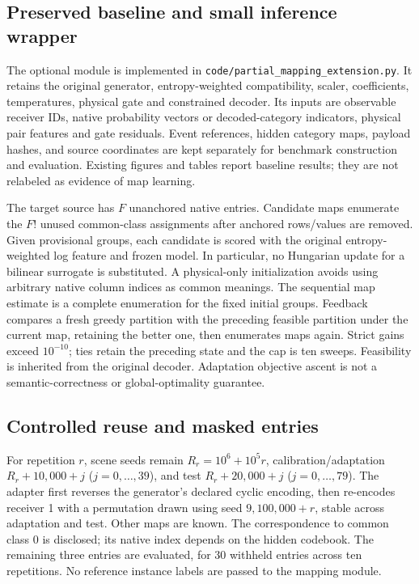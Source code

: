 \documentclass[10pt,a4paper]{article}
\begin{document}
\subsection{Preserved baseline and small inference wrapper}
The optional module is implemented in \texttt{code/partial\_mapping\_extension.py}. It retains the original generator, entropy-weighted compatibility, scaler, coefficients, temperatures, physical gate and constrained decoder. Its inputs are observable receiver IDs, native probability vectors or decoded-category indicators, physical pair features and gate residuals. Event references, hidden category maps, payload hashes, and source coordinates are kept separately for benchmark construction and evaluation. Existing figures and tables report baseline results; they are not relabeled as evidence of map learning.

The target source has $F$ unanchored native entries. Candidate maps enumerate the $F!$ unused common-class assignments after anchored rows/values are removed. Given provisional groups, each candidate is scored with the original entropy-weighted log feature and frozen model. In particular, no Hungarian update for a bilinear surrogate is substituted. A physical-only initialization avoids using arbitrary native column indices as common meanings. The sequential map estimate is a complete enumeration for the fixed initial groups. Feedback compares a fresh greedy partition with the preceding feasible partition under the current map, retaining the better one, then enumerates maps again. Strict gains exceed $10^{-10}$; ties retain the preceding state and the cap is ten sweeps. Feasibility is inherited from the original decoder. Adaptation objective ascent is not a semantic-correctness or global-optimality guarantee.

\subsection{Controlled reuse and masked entries}
For repetition $r$, scene seeds remain $R_r=10^6+10^5r$, calibration/adaptation $R_r+10{,}000+j$ ($j=0,\ldots,39$), and test $R_r+20{,}000+j$ ($j=0,\ldots,79$). The adapter first reverses the generator's declared cyclic encoding, then re-encodes receiver 1 with a permutation drawn using seed $9{,}100{,}000+r$, stable across adaptation and test. Other maps are known. The correspondence to common class 0 is disclosed; its native index depends on the hidden codebook. The remaining three entries are evaluated, for 30 withheld entries across ten repetitions. No reference instance labels are passed to the mapping module.
\end{document}
